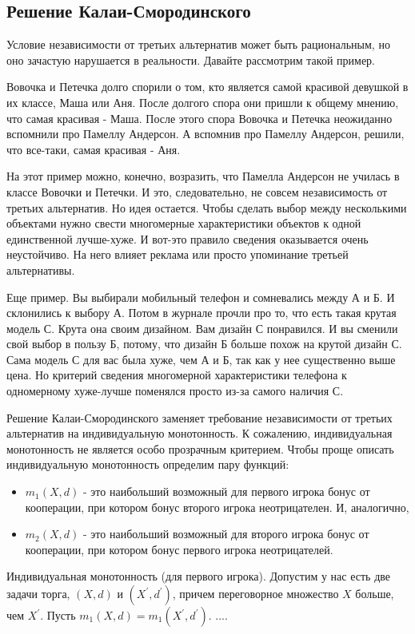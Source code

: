 \subsection{Решение Калаи-Смородинского}

Условие независимости от третьих альтернатив может быть рациональным,
но оно зачастую нарушается в реальности. Давайте рассмотрим такой
пример.

Вовочка и Петечка долго спорили о том, кто является самой красивой
девушкой в их классе, Маша или Аня. После долгого спора они пришли
к общему мнению, что самая красивая - Маша. После этого спора Вовочка
и Петечка неожиданно вспомнили про Памеллу Андерсон. А вспомнив про
Памеллу Андерсон, решили, что все-таки, самая красивая - Аня.

На этот пример можно, конечно, возразить, что Памелла Андерсон не
училась в классе Вовочки и Петечки. И это, следовательно, не совсем
независимость от третьих альтернатив. Но идея остается. Чтобы сделать
выбор между несколькими объектами нужно свести многомерные характеристики
объектов к одной единственной лучше-хуже. И вот-это правило сведения
оказывается очень неустойчиво. На него влияет реклама или просто упоминание
третьей альтернативы.

Еще пример. Вы выбирали мобильный телефон и сомневались между А и
Б. И склонились к выбору А. Потом в журнале прочли про то, что есть
такая крутая модель С. Крута она своим дизайном. Вам дизайн С понравился.
И вы сменили свой выбор в пользу Б, потому, что дизайн Б больше похож
на крутой дизайн С. Сама модель С для вас была хуже, чем А и Б, так
как у нее существенно выше цена. Но критерий сведения многомерной
характеристики телефона к одномерному хуже-лучше поменялся просто
из-за самого наличия С.

Решение Калаи-Смородинского заменяет требование независимости от третьих
альтернатив на индивидуальную монотонность. К сожалению, индивидуальная
монотонность не является особо прозрачным критерием. Чтобы проще описать
индивидуальную монотонность определим пару функций:
\begin{itemize}
\item $m_{1}(X,d)$ - это наибольший возможный для первого игрока бонус
от кооперации, при котором бонус второго игрока неотрицателен. И,
аналогично, 
\item $m_{2}(X,d)$ - это наибольший возможный для второго игрока бонус
от кооперации, при котором бонус первого игрока неотрицателей.
\end{itemize}
Индивидуальная монотонность (для первого игрока). Допустим у нас есть
две задачи торга, $(X,d)$ и $(X^{'},d^{'})$, причем переговорное
множество $X$ больше, чем $X^{'}$. Пусть $m_{1}(X,d)=m_{1}(X^{'},d^{'})$.
....

